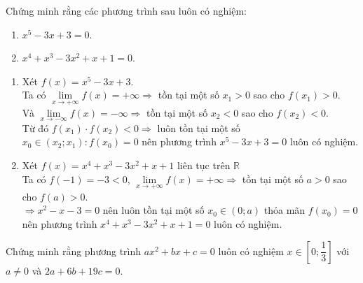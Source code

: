 \begin{bt}%
	Chứng minh rằng các phương trình sau luôn có nghiệm:
	\begin{enumerate}
		\item $x^5-3 x+3=0$.
		\item $x^4+x^3-3 x^2+x+1=0$.
	\end{enumerate}
	\loigiai
	{\begin{enumerate}
			\item Xét $f(x)=x^5-3 x+3$.\\
			Ta có
			$\lim\limits_{x \rightarrow+\infty} f(x)=+\infty \Rightarrow$ tồn tại một số $x_1>0$ sao cho $f\left(x_1\right)>0$.\\
			Và $\lim\limits_{x \rightarrow-\infty} f(x)=-\infty \Rightarrow$ tồn tại một số $x_2<0$ sao cho $f\left(x_2\right)<0$.\\
			Từ đó $f\left(x_1\right) \cdot f\left(x_2\right)<0 \Rightarrow$ luôn tồn tại một số $x_0 \in\left(x_2 ; x_1\right): f\left(x_0\right)=0$ nên phương trình $x^5-3 x+3=0$ luôn có nghiệm.
			\item Xét $f(x)=x^4+x^3-3 x^2+x+1$ liên tục trên $\mathbb{R}$\\
			Ta có $f(-1)=-3<0$,
			$\lim\limits_{x \rightarrow+\infty} f(x)=+\infty \Rightarrow$ tồn tại một số $a>0$ sao cho $f(a)>0$.\\
			$\Rightarrow x^2-x-3=0$ nên luôn tồn tại một số $x_0 \in(0 ; a)$ thỏa mãn $f\left(x_0\right)=0$ nên phương trình $x^4+x^3-3 x^2+x+1=0$ luôn có nghiệm.	
		\end{enumerate}
	}
\end{bt}

\begin{bt}%
	Chứng minh rằng phương trình $a x^2+b x+c=0$ luôn có nghiệm $x \in\left[0 ; \dfrac{1}{3}\right]$ với $a \neq 0$ và $2 a+6 b+19 c=0$.
\end{bt}

